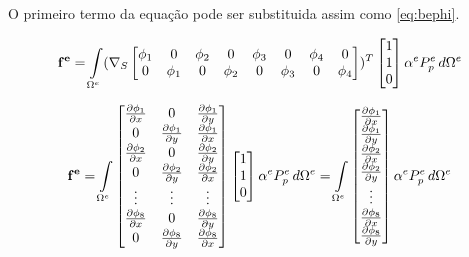 O primeiro termo da equação pode ser substituida assim como \eqref{eq:bephi}.


\begin{equation}
   \mathbf{ f^e } = \omeeint{(\sopnabla \begin{bmatrix}
                        \phi_1 & 0      & \phi_2 & 0 & \phi_3 & 0 & \phi_4 & 0\\ 
                        0      & \phi_1 & 0 & \phi_2 & 0 & \phi_3 & 0 & \phi_4
                    \end{bmatrix} ) ^ T \begin{bmatrix}
                    1\\1\\0
                    \end{bmatrix} \alpha^e P^e_p}
\end{equation}

\begin{equation} \label{eq:cargafinal}
   \mathbf{ f^e } = \omeeint{\begin{bmatrix}
    \dx[\phi_1] & 0           & \dy[\phi_1] \\
    0           & \dy[\phi_1] & \dx[\phi_1] \\
    \dx[\phi_2] & 0           & \dy[\phi_2] \\
    0           & \dy[\phi_2] & \dx[\phi_2] \\
    \vdots      & \vdots & \vdots      \\

    \dx[\phi_8] & 0           & \dy[\phi_8] \\
    0           & \dy[\phi_8] & \dx[\phi_8] \\

    \end{bmatrix} \begin{bmatrix}  1\\1\\0 \end{bmatrix} \alpha^e P^e_p }
    = \omeeint{\begin{bmatrix}
      \dx[\phi_1] \\
      \dy[\phi_1] \\
      \dx[\phi_2] \\
      \dy[\phi_2] \\
      \vdots      \\
      \dx[\phi_8] \\
      \dy[\phi_8] \\
    \end{bmatrix} \alpha^e P^e_p }
\end{equation}

